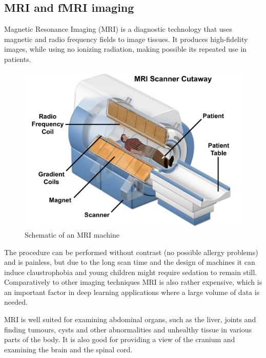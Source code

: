 	
	\subsection{MRI and fMRI imaging}
	
	Magnetic Resonance Imaging (MRI) is a diagnostic technology that uses magnetic and radio frequency fields to image tissues\cite{atkins2002fully}. It produces high-fidelity images, while using no ionizing radiation, making possible its repeated use in patients. 
	
	\begin{figure}[!h]
		\centering
		\includegraphics[width=\textwidth]{figures/mri_scanner.png}
		\caption{Schematic of an MRI machine\cite{mripage}}
	\end{figure}
	
	The procedure can be performed without contrast (no possible allergy problems) and is painless, but due to the long scan time and the design of machines it can induce claustrophobia and young children might require sedation to remain still. Comparatively to other imaging techniques MRI is also rather expensive, which is an important factor in deep learning applications where a large volume of data is needed.
	
	MRI is well suited for examining abdominal organs, such as the liver, joints and finding tumours, cysts and other abnormalities and unhealthy tissue in various parts of the body. It is also good for providing a view of the cranium and examining the brain and the spinal cord.
	
